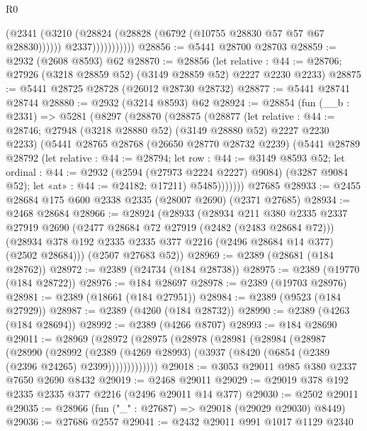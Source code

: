 \begin{lexlean}{R0}
\begin{coremodule}
                          (@2341
                            (@3210 (@28824 (@28828 (@6792 (@10755 @28830 @57 @57 @67 @28830))))))
                          @2337)))))))))))
@28856 := @5441 @28700 @28703
@28859 := @2932 (@2608 @8593) @62
@28870 := @28856
    (let relative : @44 := @28706; @27926 (@3218 @28859 @52) (@3149 @28859 @52) @2227 @2230 @2233)
@28875 := @5441 @28725 @28728 (@26012 @28730 @28732)
@28877 := @5441 @28741 @28744
@28880 := @2932 (@3214 @8593) @62
@28924 := @28854
    (fun (__b : @2331) =>
    @5281
      (@8297
        (@28870
          (@28875
            (@28877
              (let relative : @44 := @28746;
              @27948 (@3218 @28880 @52) (@3149 @28880 @52) @2227 @2230 @2233)
              (@5441
                @28765
                @28768
                (@26650 @28770 @28732 @2239)
                (@5441
                  @28789
                  @28792
                  (let relative : @44 := @28794;
                  let row : @44 := @3149 @8593 @52;
                  let ordinal : @44 := @2932 (@2594 (@27973 @2224 @2227) @9084) (@3287 @9084 @52);
                  let «at» : @44 := @24182; @17211)
                  @5485)))))))
    @27685
@28933 := @2455 @28684 @175 @600 @2338 @2335 (@28007 @2690) (@2371 @27685)
@28934 := @2468 @28684
@28966 := @28924
    (@28933
      (@28934
        @211
        @380
        @2335
        @2337
        @27919
        @2690
        (@2477 @28684 @72 @27919 (@2482 (@2483 @28684 @72)))
        (@28934 @378 @192 @2335 @2335 @377 @2216 (@2496 @28684 @14 @377) (@2502 @28684)))
      (@2507 @27683 @52))
@28969 := @2389 (@28681 (@184 @28762))
@28972 := @2389 (@24734 (@184 @28738))
@28975 := @2389 (@19770 (@184 @28722))
@28976 := @184 @28697
@28978 := @2389 (@19703 @28976)
@28981 := @2389 (@18661 (@184 @27951))
@28984 := @2389 (@9523 (@184 @27929))
@28987 := @2389 (@4260 (@184 @28732))
@28990 := @2389 (@4263 (@184 @28694))
@28992 := @2389 (@4266 @8707)
@28993 := @184 @28690
@29011 := @28969
    (@28972
      (@28975
        (@28978
          (@28981
            (@28984
              (@28987
                (@28990
                  (@28992
                    (@2389
                      (@4269 @28993)
                      (@3937 (@8420 (@6854 (@2389 (@2396 @24265) @2399)))))))))))))
@29018 := @3053 @29011 @985 @380 @2337 @7650 @2690 @8432
@29019 := @2468 @29011
@29029 := @29019 @378 @192 @2335 @2335 @377 @2216 (@2496 @29011 @14 @377)
@29030 := @2502 @29011
@29035 := @28966 (fun ("_" : @27687) => @29018 (@29029 @29030) @8449)
@29036 := @27686 @2557
@29041 := @2432 @29011 @991 @1017 @1129 @2340

\end{coremodule}
\end{lexlean}
